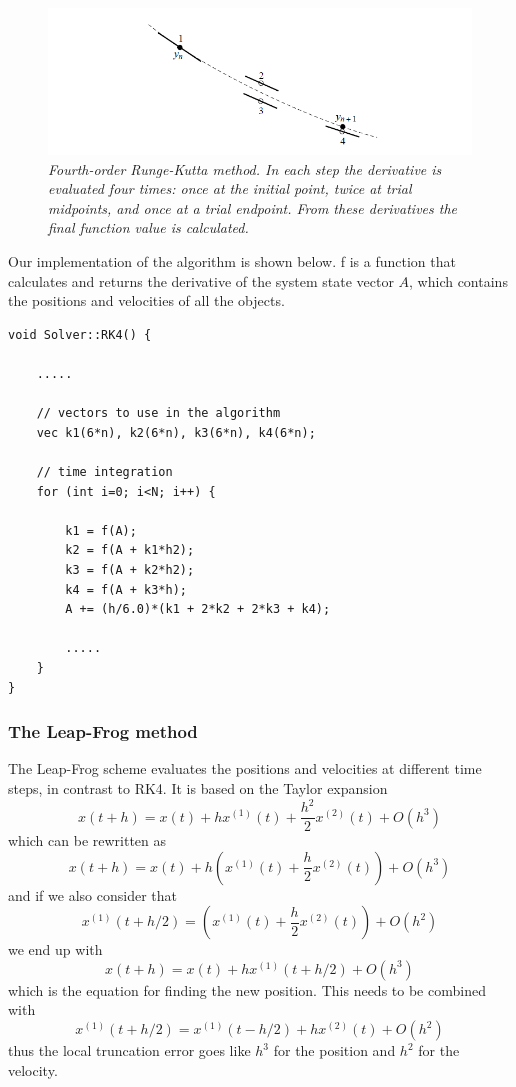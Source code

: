 \documentclass[a4paper,12pt, english]{article}
\begin{document}
\begin{figure}[H]
  \centering \includegraphics[scale=0.5]{rk4.png}
  \caption{\textit{Fourth-order Runge-Kutta method. In each step the derivative is evaluated four times:
once at the initial point, twice at trial midpoints, and once at a trial endpoint. From these derivatives the
final function value is calculated. }}
\end{figure}

\lstset{
  basicstyle=\small\ttfamily,
  frame=lrtb,
  numbers=left
}

Our implementation of the algorithm is shown below. f is a function that calculates and returns the derivative of the system state vector $A$, which contains the positions and velocities of all the objects.

\begin{lstlisting}[title={Function RK4}]
void Solver::RK4() {

    .....

    // vectors to use in the algorithm
    vec k1(6*n), k2(6*n), k3(6*n), k4(6*n);
 
    // time integration
    for (int i=0; i<N; i++) {

        k1 = f(A);
        k2 = f(A + k1*h2);
        k3 = f(A + k2*h2);
        k4 = f(A + k3*h);
        A += (h/6.0)*(k1 + 2*k2 + 2*k3 + k4);
        
        .....
    }
}
\end{lstlisting}



\subsubsection*{The Leap-Frog method}

The Leap-Frog scheme evaluates the positions and velocities at different time steps, in contrast to RK4. It is based on the Taylor expansion
\[
x(t+h) = x(t) + hx^{(1)}(t) + \frac{h^2}{2}x^{(2)}(t) + O(h^3)
\]
which can be rewritten as
\[
x(t+h) = x(t) + h \left( x^{(1)}(t) + \frac{h}{2}x^{(2)}(t) \right) + O(h^3)
\]
and if we also consider that
\[
x^{(1)}(t+h/2) = \left( x^{(1)}(t) + \frac{h}{2}x^{(2)}(t) \right) + O(h^2)
\]
we end up with
\[
x(t+h) = x(t) + hx^{(1)}(t+h/2) + O(h^3) \tag{1}
\]
which is the equation for finding the new position. This needs to be combined with
\[
x^{(1)}(t+h/2) = x^{(1)}(t-h/2) + hx^{(2)}(t) + O(h^2) \tag{2}
\]
thus the local truncation error goes like $h^3$ for the position and $h^2$ for the velocity.
\end{document}
